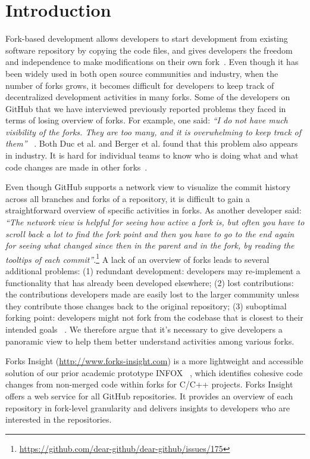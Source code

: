 \section{Introduction}
Fork-based development allows developers to start development from existing software repository by copying the code files, and gives developers the freedom and independence to make modifications on their own fork~\cite{dubinsky2013exploratory, bitzer2006impact, ernst2010code,vetter2007open}. Even though it has been widely used in both open source communities and industry, when the number of forks grows, it becomes difficult for developers to keep track of decentralized development activities in many forks. Some of the developers on GitHub that we have interviewed previously reported problems they faced in terms of losing overview of forks. For example, one said: \emph{``I do not have much visibility of the forks. They are too many, and it is overwhelming to keep track of them''} ~\cite{ZSLXWK:ICSE18}. Both Duc et al. and Berger et al. found that this problem also appears in industry. It is hard for individual teams to know who is doing what and what code changes are made in other forks~\cite{berger2014three,Duc:2014:FCM:2652524.2652546}.

Even though GitHub supports a network view to visualize the commit history across all branches and forks of a repository, it is difficult to gain a straightforward overview of specific activities in forks. As another developer said: \emph{``The network view is helpful for seeing how active a fork is, but often you have to scroll back a lot to find the fork point and then you have to go to the end again for seeing what changed since then in the parent and in the fork, by reading the tooltips of each commit''}.\footnote{\url{https://github.com/dear-github/dear-github/issues/175}}
 A lack of an overview of forks leads to several additional problems: (1) redundant development: developers may re-implement a functionality that has already been developed elsewhere; (2) lost contributions: the contributions developers made are easily lost to the larger community unless they contribute those changes back to the original repository; (3) suboptimal forking point: developers might not fork from the codebase that is closest to their intended goals ~\cite{ZSLXWK:ICSE18, dubinsky2013exploratory,stanciulescu2015forked}. We therefore argue that it's necessary to give developers a panoramic view to help them better understand activities among various forks.

Forks Insight (\url{http://www.forks-insight.com}) is a more lightweight and accessible solution of our prior academic prototype INFOX ~\cite{ZSLXWK:ICSE18}, which identifies cohesive code changes from non-merged code within forks for C/C++ projects. Forks Insight offers a web service for all GitHub repositories. It provides an overview of each repository in fork-level granularity and delivers insights to developers who are interested in the repositories.

